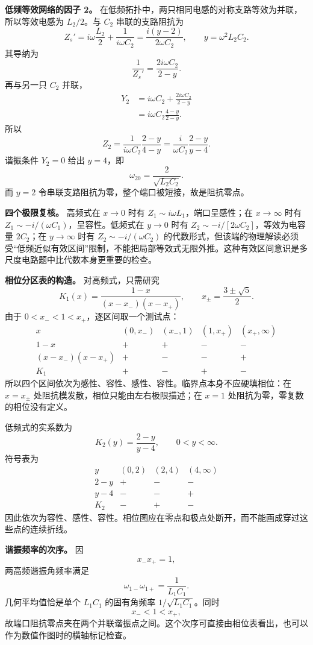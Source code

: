 \documentclass[12pt,a4paper,UTF8]{ctexart}
\begin{document}
\textbf{低频等效网络的因子 2。}
在低频拓扑中，两只相同电感的对称支路等效为并联，所以等效电感为
\(L_2/2\)。与 \(C_2\) 串联的支路阻抗为 \[
Z_s'=i\omega\frac{L_2}{2}+\frac1{i\omega C_2}
=\frac{i(y-2)}{2\omega C_2},
\qquad y=\omega^2L_2C_2.
\] 其导纳为 \[
\frac1{Z_s'}=\frac{2i\omega C_2}{2-y}.
\] 再与另一只 \(C_2\) 并联， \[
\begin{aligned}
Y_2
&=i\omega C_2+\frac{2i\omega C_2}{2-y}\\
&=i\omega C_2\frac{4-y}{2-y}.
\end{aligned}
\] 所以 \[
Z_2=\frac1{i\omega C_2}\frac{2-y}{4-y}
=\frac{i}{\omega C_2}\frac{2-y}{y-4}.
\] 谐振条件 \(Y_2=0\) 给出 \(y=4\)，即 \[
\omega_{20}=\frac2{\sqrt{L_2C_2}}.
\] 而 \(y=2\) 令串联支路阻抗为零，整个端口被短接，故是阻抗零点。

\textbf{四个极限复核。} 高频式在 \(x\to0\) 时有
\(Z_1\sim i\omega L_1\)，端口呈感性；在 \(x\to\infty\) 时有
\(Z_1\sim-i/(\omega C_1)\)，呈容性。低频式在 \(y\to0\) 时有
\(Z_2\sim-i/[2\omega C_2]\)，等效为电容量 \(2C_2\)；在 \(y\to\infty\)
时有 \(Z_2\sim-i/(\omega C_2)\)
的代数形式，但该端的物理解读必须受``低频近似有效区间''限制，不能把局部等效式无限外推。这种有效区间意识是多尺度电路题中比代数本身更重要的检查。

\textbf{相位分区表的构造。} 对高频式，只需研究 \[
K_1(x)=\frac{1-x}{(x-x_-)(x-x_+)},\qquad
x_\pm=\frac{3\pm\sqrt5}{2}.
\] 由于 \(0<x_-<1<x_+\)，逐区间取一个测试点： \[
\begin{array}{c|cccc}
x&(0,x_-)&(x_-,1)&(1,x_+)&(x_+,\infty)\\ \hline
1-x&+&+&-&-\\
(x-x_-)(x-x_+)&+&-&-&+\\ \hline
K_1&+&-&+&-
\end{array}
\] 所以四个区间依次为感性、容性、感性、容性。临界点本身不应硬填相位：在
\(x=x_\pm\) 处阻抗模发散，相位只能由左右极限描述；在 \(x=1\)
处阻抗为零，零复数的相位没有定义。

低频式的实系数为 \[
K_2(y)=\frac{2-y}{y-4},\qquad 0<y<\infty.
\] 符号表为 \[
\begin{array}{c|ccc}
y&(0,2)&(2,4)&(4,\infty)\\ \hline
2-y&+&-&-\\
y-4&-&-&+\\ \hline
K_2&-&+&-
\end{array}
\]
因此依次为容性、感性、容性。相位图应在零点和极点处断开，而不能画成穿过这些点的连续折线。

\textbf{谐振频率的次序。} 因 \[
x_-x_+=1,
\] 两高频谐振角频率满足 \[
\omega_{1-}\omega_{1+}=\frac1{L_1C_1}.
\] 几何平均值恰是单个 \(L_1C_1\) 的固有角频率 \(1/\sqrt{L_1C_1}\)。同时
\[
x_-<1<x_+,
\]
故端口阻抗零点夹在两个并联谐振点之间。这个次序可直接由相位表看出，也可以作为数值作图时的横轴标记检查。
\end{document}
